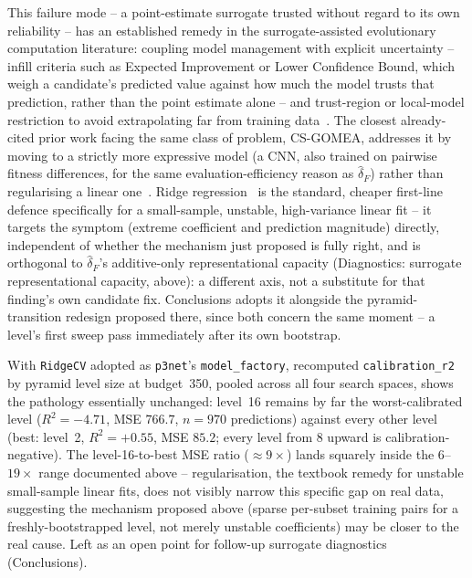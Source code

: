 This failure mode -- a point-estimate surrogate trusted without regard to its own reliability -- has an
established remedy in the surrogate-assisted evolutionary computation literature: coupling model management
with explicit uncertainty -- infill criteria such as Expected Improvement or Lower Confidence Bound, which
weigh a candidate's predicted value against how much the model trusts that prediction, rather than the point
estimate alone -- and trust-region or local-model restriction to avoid extrapolating far from training
data~\citep{jin2011surrogate}. The closest already-cited prior work facing the same class of problem,
CS-GOMEA, addresses it by moving to a strictly more expressive model (a CNN, also trained on pairwise
fitness differences, for the same evaluation-efficiency reason as $\hat\delta_F$) rather than regularising a
linear one~\citep{dushatskiy2019csgomea}. Ridge regression~\citep{hoerl1970ridge} is the standard, cheaper
first-line defence specifically for a small-sample, unstable, high-variance linear fit -- it targets the
symptom (extreme coefficient and prediction magnitude) directly, independent of whether the mechanism just
proposed is fully right, and is orthogonal to $\hat\delta_F$'s additive-only representational capacity
(Diagnostics: surrogate representational capacity, above): a different axis, not a substitute for that
finding's own candidate fix. Conclusions adopts it alongside the pyramid-transition redesign proposed there,
since both concern the same moment -- a level's first sweep pass immediately after its own bootstrap.

With \texttt{RidgeCV} adopted as \texttt{p3net}'s \texttt{model\_factory}, recomputed \texttt{calibration\_r2}
by pyramid level size at budget~350, pooled across all four search spaces, shows the pathology essentially
unchanged: level~16 remains by far the worst-calibrated level ($R^2=-4.71$, MSE $766.7$, $n=970$ predictions)
against every other level (best: level~2, $R^2=+0.55$, MSE $85.2$; every level from 8 upward is
calibration-negative). The level-16-to-best MSE ratio ($\approx9\times$) lands squarely inside the
$6$--$19\times$ range documented above -- regularisation, the textbook remedy for unstable small-sample
linear fits, does not visibly narrow this specific gap on real data, suggesting the mechanism proposed above
(sparse per-subset training pairs for a freshly-bootstrapped level, not merely unstable coefficients) may be
closer to the real cause. Left as an open point for follow-up surrogate diagnostics (Conclusions).

